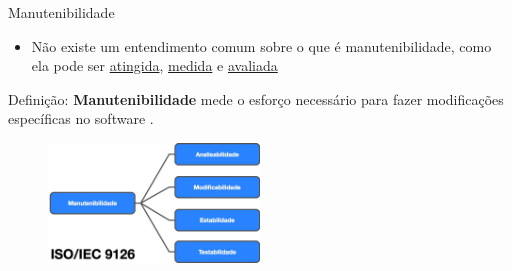 \begin{frame}[t, fragile]{Manutenibilidade}
    \begin{itemize}
      \item \alert{Não} existe um \alert{entendimento} comum sobre o que é \alert{manutenibilidade}, como
        ela pode ser \underline{atingida}, \underline{medida} e \underline{avaliada}

      
  \end{itemize}
  \begin{block}{Definição:}
        \textbf{Manutenibilidade} mede o \alert{esforço} necessário para fazer \alert{modificações} específicas no software \textcolor{Blue}{\cite{Cortes2001}}.
      \end{block}
  
  \begin{figure}[hbt]
    \includegraphics[width=0.5\textwidth]{imagens/subcaracteristica-manutenibilidade.jpg}
  \end{figure}
  
\end{frame}

